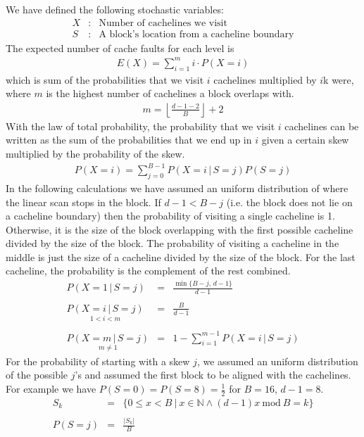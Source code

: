 We have defined the following stochastic variables:
\begin{eqnarray*}
X & : & \textrm{Number of cachelines we visit}\\
S & : & \textrm{A block's location from a cacheline boundary}
\end{eqnarray*}
The expected number of cache faults for each level is
\begin{eqnarray*}
E(X) = \sum_{i=1}^{m}i\cdot P(X=i)
\end{eqnarray*}
which is sum of the probabilities that we visit $i$ cachelines multiplied by $i$k were, where $m$ is the highest number of cachelines a block overlaps with.
\begin{eqnarray*}
m = \left\lfloor \frac{d-1-2}{B}\right\rfloor + 2
\end{eqnarray*}
With the law of total probability, the probability that we visit $i$ cachelines can be written as the sum of the probabilities that we end up in $i$ given a certain skew multiplied by the probability of the skew.
\begin{eqnarray*}
P(X=i) = \sum_{j=0}^{B-1}P(X=i\,|\, S=j)P(S=j)
\end{eqnarray*}
In the following calculations we have assumed an uniform distribution of where the linear scan stops in the block. If $d - 1 < B - j$ (i.e. the block does not lie on a cacheline boundary) then the probability of visiting a single cacheline is 1. Otherwise, it is the size of the block overlapping with the first possible cacheline divided by the size of the block. The probability of visiting a cacheline in the middle is just the size of a cacheline divided by the size of the block. For the last cacheline, the probability is the complement of the rest combined.
\begin{eqnarray*}
P(X=1\,|\, S=j) & = & \frac{\min\{B-j,\, d-1\}}{d-1}\\
\\
\underset{1 < i < m}{P(X=i\,|\, S=j)} & = & \frac{B}{d-1}\\
\\
\underset{m\neq1}{P(X=m\,|\, S=j)} & = & 1-\sum_{i=1}^{m-1}P(X=i\,|\, S=j)
\end{eqnarray*}
For the probability of starting with a skew $j$, we assumed an uniform distribution of the possible $j$'s and assumed the first block to be aligned with the cachelines. For example we have $P(S = 0) = P(S = 8) = \frac{1}{2}$ for $B = 16$, $d - 1 = 8$.
\begin{eqnarray*}
S_k & = & \{ 0 \leq x < B\ |\ x \in \mathbb{N} \wedge (d - 1)x\ \textrm{mod}\ B = k \}\\
\\
P(S=j) & = & \frac{|S_k|}{B}
\end{eqnarray*}


